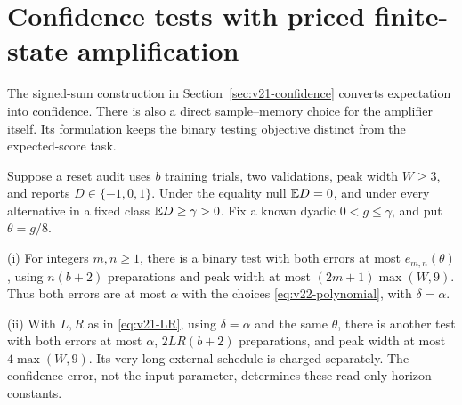 \section{Confidence tests with priced finite-state amplification}
\label{sec:v22-confidence}
The signed-sum construction in Section~\ref{sec:v21-confidence}
converts expectation into confidence. There is also a direct
sample--memory choice for the amplifier itself. Its formulation keeps
the binary testing objective distinct from the expected-score task.

\begin{theorem}
\label{thm:v22-confidence}
Suppose a reset audit uses $b$ training trials, two validations, peak
width $W\ge3$, and reports $D\in\{-1,0,1\}$. Under the equality null
$\mathbb E D=0$, and under every alternative in a fixed class $\mathbb E D\ge\gamma>0$.
Fix a known dyadic $0<g\le\gamma$, and put $\theta=g/8$.

\smallskip\noindent
\textup{(i)} For integers $m,n\ge1$, there is a binary test with both
errors at most $e_{m,n}(\theta)$, using $n(b+2)$ preparations and peak
width at most $(2m+1)\max(W,9)$. Thus both errors are at most $\alpha$
with the choices \eqref{eq:v22-polynomial}, with $\delta=\alpha$.

\smallskip\noindent
\textup{(ii)} With $L,R$ as in \eqref{eq:v21-LR}, using
$\delta=\alpha$ and the same $\theta$, there is another test with both
errors at most $\alpha$, $2LR(b+2)$ preparations, and peak width at
most $4\max(W,9)$. Its very long external schedule is charged
separately. The confidence error, not the input parameter, determines
these read-only horizon constants.
\end{theorem}
